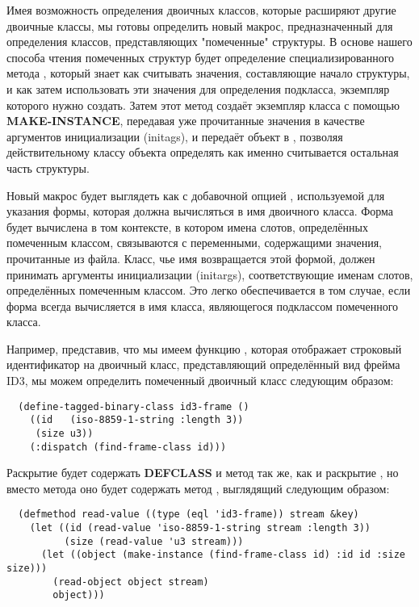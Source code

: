 Имея возможность определения двоичных классов, которые расширяют другие двоичные классы,
мы готовы определить новый макрос, предназначенный для определения классов, представляющих
"помеченные" структуры. В основе нашего способа чтения помеченных структур будет
определение специализированного метода , который знает как считывать
значения, составляющие начало структуры, и как затем использовать эти значения для
определения подкласса, экземпляр которого нужно создать. Затем этот метод создаёт
экземпляр класса с помощью \textbf{MAKE-INSTANCE}, передавая уже прочитанные значения в
качестве аргументов инициализации (initags), и передаёт объект в ,
позволяя действительному классу объекта определять как именно считывается остальная часть
структуры.

Новый макрос  будет выглядеть как
 с добавочной опцией , используемой для указания
формы, которая должна вычисляться в имя двоичного класса. Форма  будет
вычислена в том контексте, в котором имена слотов, определённых помеченным классом,
связываются с переменными, содержащими значения, прочитанные из файла. Класс, чье имя
возвращается этой формой, должен принимать аргументы инициализации (initargs),
соответствующие именам слотов, определённых помеченным классом. Это легко обеспечивается в
том случае, если форма  всегда вычисляется в имя класса, являющегося
подклассом помеченного класса.

Например, представив, что мы имеем функцию , которая отображает
строковый идентификатор на двоичный класс, представляющий определённый вид фрейма ID3, мы
можем определить помеченный двоичный класс  следующим образом:

\begin{lstlisting}
  (define-tagged-binary-class id3-frame ()
    ((id   (iso-8859-1-string :length 3))
     (size u3))
    (:dispatch (find-frame-class id)))
\end{lstlisting}

Раскрытие  будет содержать \textbf{DEFCLASS} и метод  так же, как и раскрытие , но вместо метода  оно будет содержать метод , выглядящий следующим образом:

\begin{lstlisting}
  (defmethod read-value ((type (eql 'id3-frame)) stream &key)
    (let ((id (read-value 'iso-8859-1-string stream :length 3))
          (size (read-value 'u3 stream)))
      (let ((object (make-instance (find-frame-class id) :id id :size size)))
        (read-object object stream)
        object)))
\end{lstlisting}

